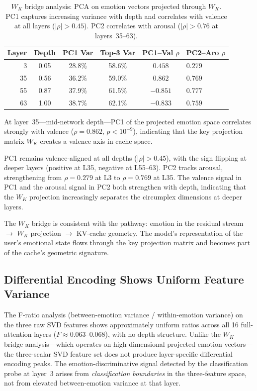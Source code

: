 \documentclass[11pt,a4paper]{article}
\begin{document}
\begin{table}[H]
\centering
\caption{$W_K$ bridge analysis: PCA on emotion vectors projected through $W_K$. PC1 captures increasing variance with depth and correlates with valence at all layers ($|\rho| > 0.45$). PC2 correlates with arousal ($|\rho| > 0.76$ at layers~35--63).}
\label{tab:bridge}
\begin{tabular}{rccccl}
\toprule
\textbf{Layer} & \textbf{Depth} & \textbf{PC1 Var} & \textbf{Top-3 Var} & \textbf{PC1--Val $\rho$} & \textbf{PC2--Aro $\rho$} \\
\midrule
 3 & 0.05 & 28.8\% & 58.6\% & $0.458$ & $0.279$ \\
35 & 0.56 & 36.2\% & 59.0\% & $\mathbf{0.862}$ & $0.769$ \\
55 & 0.87 & 37.9\% & 61.5\% & $-0.851$ & $0.777$ \\
63 & 1.00 & 38.7\% & 62.1\% & $-0.833$ & $0.759$ \\
\bottomrule
\end{tabular}
\end{table}

At layer~35---mid-network depth---PC1 of the projected emotion space correlates strongly with valence ($\rho = 0.862$, $p < 10^{-9}$), indicating that the key projection matrix $W_K$ creates a valence axis in cache space.

PC1 remains valence-aligned at all depths ($|\rho| > 0.45$), with the sign flipping at deeper layers (positive at L35, negative at L55--63). PC2 tracks arousal, strengthening from $\rho = 0.279$ at L3 to $\rho = 0.769$ at L35. The valence signal in PC1 and the arousal signal in PC2 both strengthen with depth, indicating that the $W_K$ projection increasingly separates the circumplex dimensions at deeper layers.

The $W_K$ bridge is consistent with the pathway: emotion in the residual stream $\to$ $W_K$ projection $\to$ KV-cache geometry. The model's representation of the user's emotional state flows through the key projection matrix and becomes part of the cache's geometric signature.

\subsection{Differential Encoding Shows Uniform Feature Variance}

The F-ratio analysis (between-emotion variance / within-emotion variance) on the three raw SVD features shows approximately uniform ratios across all 16 full-attention layers ($F \approx 0.063$--$0.068$), with no depth structure. Unlike the $W_K$ bridge analysis---which operates on high-dimensional projected emotion vectors---the three-scalar SVD feature set does not produce layer-specific differential encoding peaks. The emotion-discriminative signal detected by the classification probe at layer~3 arises from \emph{classification boundaries} in the three-feature space, not from elevated between-emotion variance at that layer.
\end{document}
